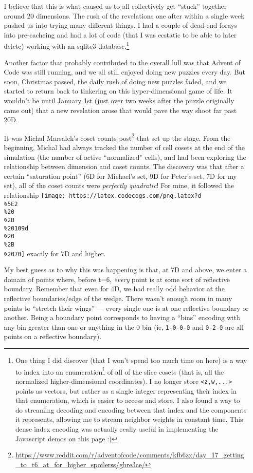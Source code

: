 \documentclass[]{article}
\renewcommand{\href}[2]{#2\footnote{\url{#1}}}
\begin{document}
I believe that this is what caused us to all collectively get ``stuck'' together
around 20 dimensions. The rush of the revelations one after within a single week
pushed us into trying many different things. I had a couple of dead-end forays
into pre-cacheing and had a lot of code (that I was ecstatic to be able to later
delete) working with an sqlite3 database.\footnote{One thing I did discover
  (that I won't spend too much time on here) is a way to
  \href{https://www.reddit.com/r/adventofcode/comments/kfb6zx/day_17_getting_to_t6_at_for_higher_spoilerss/gim68l0/}{index
  into an enumeration} of all of the slice cosets (that is, all the normalized
  higher-dimensional coordinates). I no longer store
  \texttt{\textless{}z,w,...\textgreater{}} points as vectors, but rather as a
  single integer representing their index in that enumeration, which is easier
  to access and store. I also found a way to do streaming decoding and encoding
  between that index and the components it represents, allowing me to stream
  neighbor weights in constant time. This dense index encoding was actually
  really useful in implementing the Javascript demos on this page :)}

Another factor that probably contributed to the overall lull was that Advent of
Code was still running, and we all still enjoyed doing new puzzles every day.
But soon, Christmas passed, the daily rush of doing new puzzles faded, and we
started to return back to tinkering on this hyper-dimensional game of life. It
wouldn't be until January 1st (just over two weeks after the puzzle originally
came out) that a new revelation arose that would pave the way shoot far past
20D.

It was
\href{https://www.reddit.com/r/adventofcode/comments/kfb6zx/day_17_getting_to_t6_at_for_higher_spoilerss/ghre3ce/}{Michal
Marsalek's coset counts post} that set up the stage. From the beginning, Michal
had always tracked the number of cell cosets at the end of the simulation (the
number of active ``normalized'' cells), and had been exploring the relationship
between dimension and coset counts. The discovery was that after a certain
``saturation point'' (6D for Michael's set, 9D for Peter's set, 7D for my set),
all of the coset counts were \emph{perfectly quadratic}! For mine, it followed
the relationship
\texttt{[image: https://latex.codecogs.com/png.latex?d\\\%5E2\\\%20\\\%2B\\\%20109d\\\%20\\\%2B\\\%2070]}
exactly for 7D and higher.

My best guess as to why this was happening is that, at 7D and above, we enter a
domain of points where, before t=6, \emph{every} point is at some sort of
reflective boundary. Remember that even for 4D, we had really odd behavior at
the reflective boundaries/edge of the wedge. There wasn't enough room in many
points to ``stretch their wings'' --- every single one is at one reflective
boundary or another. Being a boundary point corresponds to having a ``bins''
encoding with any bin greater than one or anything in the 0 bin (ie,
\texttt{1-0-0-0} and \texttt{0-2-0} are all points on a reflective boundary).
\end{document}
